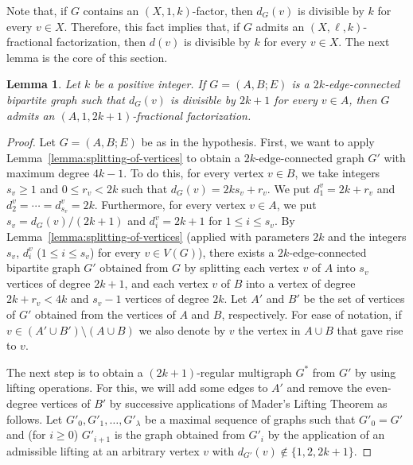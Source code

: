 \documentclass[12pt,reqno,a4paper]{amsart}
\newtheorem{lemma}[theorem]{Lemma}
\begin{document}
Note that, if \(G\) contains an \((X,1,k)\)-factor, then \(d_G(v)\) is 
divisible by $k$ for every \(v\in X\). Therefore, 
this fact implies that, if \(G\) admits an \((X,\ell,k)\)-fractional 
factorization, 
then \(d(v)\) is divisible by \(k\) for every \(v\in X\). The next lemma is the 
core of this section.



\begin{lemma}\label{lemma:1-special-decomposition}
Let \(k\) be a positive integer.
If $G=(A,B;E)$ is a $2k$-edge-connected bipartite graph such that $d_G(v)$ is 
divisible by $2k+1$ for every 
$v\in A$, then $G$ admits an \((A,1,2k+1)\)-fractional factorization.
\end{lemma}



\begin{proof}
Let \(G=(A,B;E)\) be as in the hypothesis.
First, we want to apply Lemma~\ref{lemma:splitting-of-vertices} to obtain a 
\(2k\)-edge-connected graph $G'$ 
with maximum degree \(4k-1\).
To do this, for every vertex $v \in B$, we take integers $s_v \geq 1$ and $0 \leq r_v < 2k$ 
such that $d_G(v) = 2ks_v + r_v$.
We put $d^v_1 = 2k+r_v$ and \(d^v_2 = \cdots = d^v_{s_v} = 2k\).
Furthermore, for every 
vertex $v\in A$, we put $s_v=d_G(v)/(2k+1)$ and $d^v_i=2k+1$ for $1\leq i\leq s_v$.
By Lemma~\ref{lemma:splitting-of-vertices} 
(applied with parameters $2k$ and the integers $s_v$, $d^v_i$ ($1\leq i\leq 
s_v$) for every $v\in V(G)$), there exists a 
$2k$-edge-connected bipartite graph $G'$ obtained from \(G\) by splitting each 
vertex \(v\) of \(A\) into \(s_v\) 
vertices of degree \(2k+1\), and each vertex \(v\) of \(B\) into a 
vertex of
degree $2k+r_v < 4k$ and $s_v-1$ vertices of degree $2k$.
Let \(A'\) and \(B'\) be the set of vertices of \(G'\) obtained from 
the vertices of \(A\) and \(B\),
respectively. 
For ease of notation, if \(v \in (A' \cup B') \setminus (A \cup B)\) we also 
denote by \(v\) the vertex in \(A \cup B\) that gave rise to $v$.

The next step is to obtain a $(2k+1)$-regular multigraph $G^*$ from $G'$ by 
using lifting operations. For this, we 
will add some edges to $A'$ and remove the even-degree vertices of $B'$ by successive
applications of Mader's Lifting Theorem as 
follows.
Let \(G'_0,G'_1,\ldots,G'_\lambda\) be a maximal sequence of graphs such that \(G'_0 = G'\)
and (for \(i\geq 0\)) \(G'_{i+1}\) is the graph obtained from \(G'_i\) 
by the application of an admissible lifting 
at an arbitrary vertex \(v\) with $d_{G'}(v)\notin \{1,2,2k+1\}$.


\end{proof}
\end{document}
